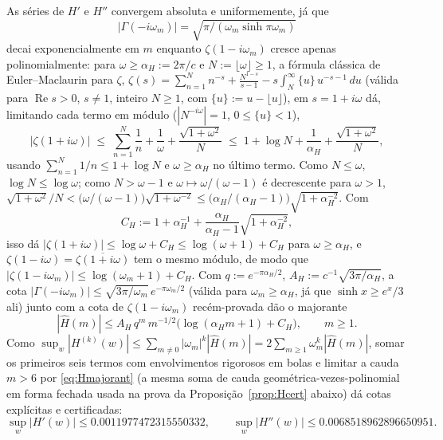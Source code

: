 \documentclass[11pt]{amsart}
\theoremstyle{plain}
\theoremstyle{definition}
\theoremstyle{remark}
\begin{document}
As séries de $H'$ e $H''$ convergem absoluta e uniformemente, já que
\[
|\Gamma(-i\omega_m)| = \sqrt{\pi/(\omega_m \sinh \pi\omega_m)}
\]
decai exponencialmente em $m$ enquanto $\zeta(1-i\omega_m)$ cresce apenas polinomialmente: para
$\omega\ge \alpha_H := 2\pi/c$ e $N:=\lfloor\omega\rfloor\ge1$, a fórmula clássica de
Euler--Maclaurin para $\zeta$, $\zeta(s) = \sum_{n=1}^N n^{-s} + \frac{N^{1-s}}{s-1} -
s\int_N^\infty\{u\}\,u^{-s-1}\,du$ (válida para $\operatorname{Re}s>0$, $s\ne1$, inteiro $N\ge1$,
com $\{u\}:=u-\lfloor u\rfloor$), em $s=1+i\omega$ dá, limitando cada termo em módulo
($|N^{-i\omega}|=1$, $0\le\{u\}<1$),
\[
|\zeta(1+i\omega)| \;\le\; \sum_{n=1}^N\frac1n + \frac1\omega + \frac{\sqrt{1+\omega^2}}{N}
\;\le\; 1+\log N + \frac1{\alpha_H} + \frac{\sqrt{1+\omega^2}}N,
\]
usando $\sum_{n=1}^N 1/n\le1+\log N$ e $\omega\ge\alpha_H$ no último termo. Como $N\le\omega$,
$\log N\le\log\omega$; como $N>\omega-1$ e $\omega\mapsto\omega/(\omega-1)$ é decrescente para
$\omega>1$, $\sqrt{1+\omega^2}/N < \bigl(\omega/(\omega-1)\bigr)\sqrt{1+\omega^{-2}} \le
\bigl(\alpha_H/(\alpha_H-1)\bigr)\sqrt{1+\alpha_H^{-2}}$. Com
\[
C_H := 1+\alpha_H^{-1}+\frac{\alpha_H}{\alpha_H-1}\sqrt{1+\alpha_H^{-2}},
\]
isso dá $|\zeta(1+i\omega)|\le\log\omega+C_H\le\log(\omega+1)+C_H$ para $\omega\ge\alpha_H$, e
$\zeta(1-i\omega)=\overline{\zeta(1+i\omega)}$ tem o mesmo módulo, de modo que
$|\zeta(1-i\omega_m)|\le\log(\omega_m+1)+C_H$. Com $q := e^{-\pi\alpha_H/2}$, $A_H :=
c^{-1}\sqrt{3\pi/\alpha_H}$, a cota $|\Gamma(-i\omega_m)|\le\sqrt{3\pi/\omega_m}\,e^{-\pi\omega_m/2}$
(válida para $\omega_m\ge\alpha_H$, já que $\sinh x\ge e^x/3$ ali) junto com a cota de
$\zeta(1-i\omega_m)$ recém-provada dão o majorante
\begin{equation}
\label{eq:Hmajorant}
|\hat H(m)| \le A_H\,q^m\,m^{-1/2}\bigl(\log(\alpha_H m+1)+C_H\bigr), \qquad m\ge1.
\end{equation}
Como $\sup_w|H^{(k)}(w)| \le \sum_{m\ne0}|\omega_m|^k|\hat H(m)| = 2\sum_{m\ge1}\omega_m^k|\hat
H(m)|$, somar os primeiros seis termos com envolvimentos rigorosos em bolas e limitar a cauda $m>6$
por \eqref{eq:Hmajorant} (a mesma soma de cauda geométrica-vezes-polinomial em forma fechada usada
na prova da Proposição~\ref{prop:Hcert} abaixo) dá cotas explícitas e certificadas:
\begin{equation}
\label{eq:Hbounds}
\sup_w |H'(w)| \le 0.0011977472315550332, \qquad \sup_w |H''(w)| \le 0.0068518962896650951.
\end{equation}
\end{document}
